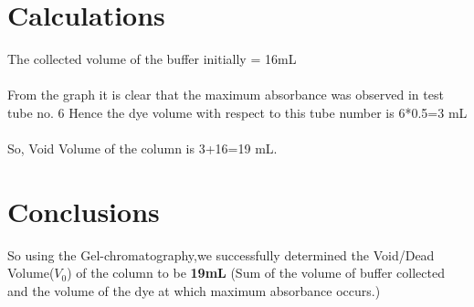 \documentclass[12pt]{article}
\theoremstyle{definition}
\theoremstyle{definition}
\theoremstyle{remark}
\begin{document}
\pagebreak
\section*{Calculations}


The collected volume of the buffer initially = 16mL\\
\\
From the graph it is clear that the maximum absorbance was observed in test tube no. 6
Hence the dye volume with respect to this tube number is 
  6*0.5=3 mL\\
\\So, Void Volume of the column is 3+16=19 mL.\\


\section*{Conclusions}
So using the Gel-chromatography,we successfully determined the Void/Dead Volume($V_{0}$) of the column to be \textbf{19mL} (Sum of the volume of buffer collected and the volume of the dye at which maximum absorbance occurs.)
\end{document}
